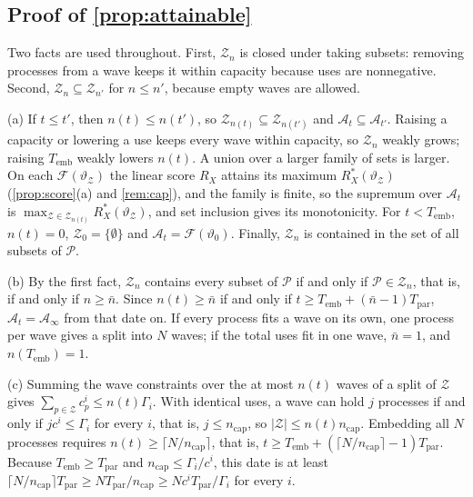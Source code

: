 \subsection*{Proof of \autoref{prop:attainable}}

Two facts are used throughout. First, $\mathcal Z_n$ is closed under taking subsets: removing processes from a wave keeps it within capacity because uses are nonnegative. Second, $\mathcal Z_n\subseteq\mathcal Z_{n'}$ for $n\le n'$, because empty waves are allowed.

(a) If $t\le t'$, then $n(t)\le n(t')$, so $\mathcal Z_{n(t)}\subseteq\mathcal Z_{n(t')}$ and $\mathcal A_t\subseteq\mathcal A_{t'}$. Raising a capacity or lowering a use keeps every wave within capacity, so $\mathcal Z_n$ weakly grows; raising $T_{\mathrm{emb}}$ weakly lowers $n(t)$. A union over a larger family of sets is larger. On each $\mathcal F(\vartheta_{\mathcal Z})$ the linear score $R_X$ attains its maximum $R^*_X(\vartheta_{\mathcal Z})$ (\autoref{prop:score}(a) and \autoref{rem:cap}), and the family is finite, so the supremum over $\mathcal A_t$ is $\max_{\mathcal Z\in\mathcal Z_{n(t)}}R^*_X(\vartheta_{\mathcal Z})$, and set inclusion gives its monotonicity. For $t<T_{\mathrm{emb}}$, $n(t)=0$, $\mathcal Z_0=\{\emptyset\}$ and $\mathcal A_t=\mathcal F(\vartheta_0)$. Finally, $\mathcal Z_n$ is contained in the set of all subsets of $\mathcal P$.

(b) By the first fact, $\mathcal Z_n$ contains every subset of $\mathcal P$ if and only if $\mathcal P\in\mathcal Z_n$, that is, if and only if $n\ge\bar n$. Since $n(t)\ge\bar n$ if and only if $t\ge T_{\mathrm{emb}}+(\bar n-1)T_{\mathrm{par}}$, $\mathcal A_t=\mathcal A_\infty$ from that date on. If every process fits a wave on its own, one process per wave gives a split into $N$ waves; if the total uses fit in one wave, $\bar n=1$, and $n(T_{\mathrm{emb}})=1$.

(c) Summing the wave constraints over the at most $n(t)$ waves of a split of $\mathcal Z$ gives $\sum_{p\in\mathcal Z}c^i_p\le n(t)\Gamma_i$. With identical uses, a wave can hold $j$ processes if and only if $jc^i\le\Gamma_i$ for every $i$, that is, $j\le n_{\mathrm{cap}}$, so $|\mathcal Z|\le n(t)n_{\mathrm{cap}}$. Embedding all $N$ processes requires $n(t)\ge\lceil N/n_{\mathrm{cap}}\rceil$, that is, $t\ge T_{\mathrm{emb}}+(\lceil N/n_{\mathrm{cap}}\rceil-1)T_{\mathrm{par}}$. Because $T_{\mathrm{emb}}\ge T_{\mathrm{par}}$ and $n_{\mathrm{cap}}\le\Gamma_i/c^i$, this date is at least $\lceil N/n_{\mathrm{cap}}\rceil T_{\mathrm{par}}\ge NT_{\mathrm{par}}/n_{\mathrm{cap}}\ge Nc^iT_{\mathrm{par}}/\Gamma_i$ for every $i$.

